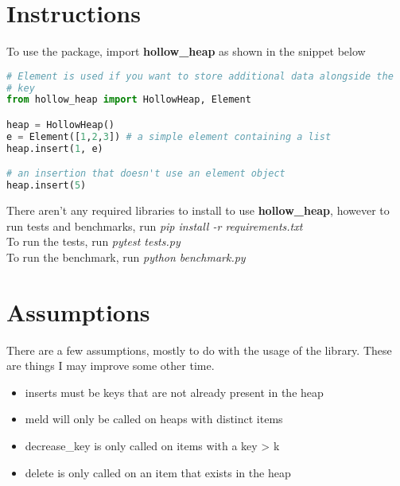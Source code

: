 \documentclass[10pt]{article}
\begin{document}
\section*{Instructions}
To use the package, import \textbf{hollow\_heap} as shown in the snippet below

\begin{lstlisting}[language=Python]
# Element is used if you want to store additional data alongside the
# key
from hollow_heap import HollowHeap, Element

heap = HollowHeap()
e = Element([1,2,3]) # a simple element containing a list
heap.insert(1, e)

# an insertion that doesn't use an element object
heap.insert(5)
\end{lstlisting}

There aren't any required libraries to install to use \textbf{hollow\_heap}, however to run tests and benchmarks, run \emph{pip install -r requirements.txt}\\

To run the tests, run \emph{pytest tests.py}\\

To run the benchmark, run \emph{python benchmark.py}\\

\section*{Assumptions}
There are a few assumptions, mostly to do with the usage of the library. These are things I may improve some other time.\\
\begin{itemize}
    \item inserts must be keys that are not already present in the heap
    \item meld will only be called on heaps with distinct items
    \item decrease\_key is only called on items with a key > k
    \item delete is only called on an item that exists in the heap
\end{itemize}
\end{document}
